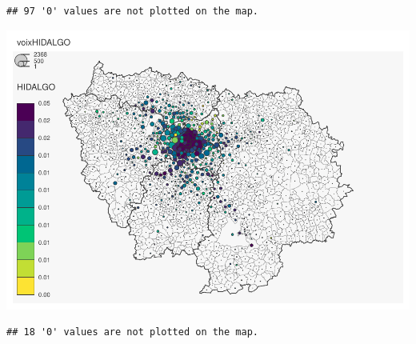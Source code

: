 \documentclass[
]{book}
\begin{document}
\begin{verbatim}
## 97 '0' values are not plotted on the map.
\end{verbatim}

\includegraphics{manuel_geo_quanti_files/figure-latex/unnamed-chunk-52-6.pdf}

\begin{verbatim}
## 18 '0' values are not plotted on the map.
\end{verbatim}
\end{document}
